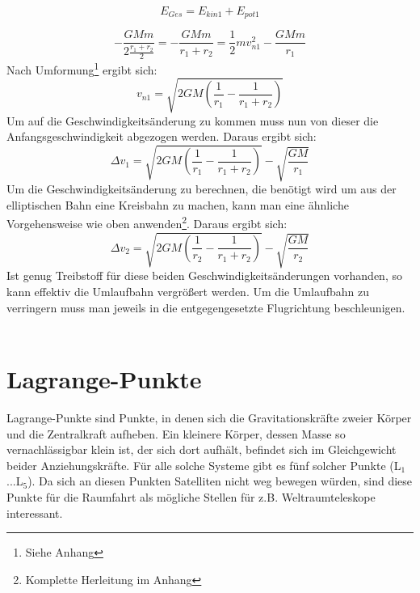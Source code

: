 \documentclass[12pt,a4paper]{article}
\begin{document}
\begin{equation}
 E_{Ges} = E_{kin1} + E_{pot1}
\end{equation} 

\begin{equation}
- \frac{GMm}{2 \frac{r_1+r_2}{2}} = - \frac{GMm}{r_1+r_2} = \frac{1}{2}mv_{n1}^2 - \frac{GMm}{r_1}
\end{equation}
Nach Umformung\footnote{Siehe Anhang} ergibt sich:
\begin{equation}
v_{n1} = \sqrt{2GM(\frac{1}{r_1}-\frac{1}{r_1+r_2})}
\end{equation}
Um auf die Geschwindigkeitsänderung zu kommen muss nun von dieser die Anfangsgeschwindigkeit abgezogen werden. Daraus ergibt sich:
\begin{equation}
\Delta v_1 = \sqrt{2GM(\frac{1}{r_1}-\frac{1}{r_1+r_2})} - \sqrt{\frac{GM}{r_1}}
\end{equation}
Um die Geschwindigkeitsänderung zu berechnen, die benötigt wird um aus der elliptischen Bahn eine Kreisbahn zu machen, kann man eine ähnliche Vorgehensweise wie oben anwenden\footnote{Komplette Herleitung im Anhang}. Daraus ergibt sich:
\begin{equation}
\Delta v_2 = \sqrt{2GM(\frac{1}{r_2} - \frac{1}{r_1+r_2})} -\sqrt{\frac{GM}{r_2}}
\end{equation}
Ist genug Treibstoff für diese beiden Geschwindigkeitsänderungen vorhanden, so kann effektiv die Umlaufbahn vergrößert werden. Um die Umlaufbahn zu verringern muss man jeweils in die entgegengesetzte Flugrichtung beschleunigen.\\\\

\section{Lagrange-Punkte}
Lagrange-Punkte sind Punkte, in denen sich die Gravitationskräfte zweier Körper und die Zentralkraft aufheben. Ein kleinere Körper, dessen Masse so  vernachlässigbar klein ist, der sich dort aufhält, befindet sich im Gleichgewicht beider Anziehungskräfte. Für alle solche Systeme gibt es fünf solcher Punkte (L$_1$...L$_5$). Da sich an diesen Punkten Satelliten nicht weg bewegen würden, sind diese Punkte für die Raumfahrt als mögliche Stellen für z.B. Weltraumteleskope interessant. 
\end{document}
